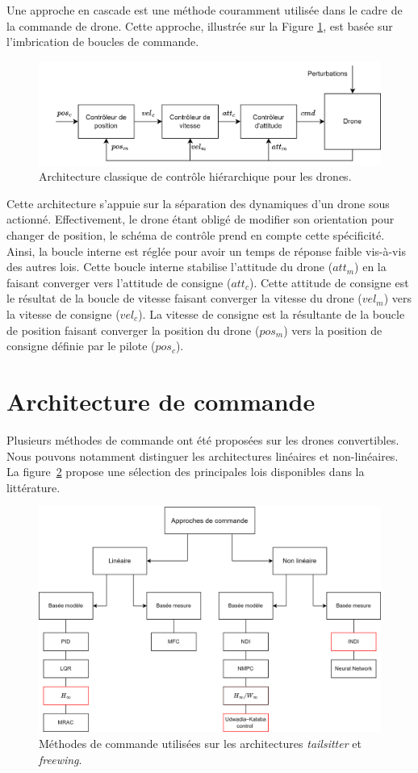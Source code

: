 Une approche en cascade est une méthode couramment utilisée dans le cadre de la commande de drone. Cette approche, illustrée sur la Figure \ref{fig:schemahiera}, est basée sur l'imbrication de boucles de  commande.
\begin{figure}[ht!]
    \centerline{
    \includegraphics[trim=0cm 0cm 0cm 0cm,clip,width=0.8\columnwidth]{figures/controlhierachique.png}}
    \caption{Architecture classique de contrôle hiérarchique pour les drones.}
    \label{fig:schemahiera}
\end{figure}
Cette architecture s'appuie sur la séparation des dynamiques d'un drone sous actionné. Effectivement, le drone étant obligé de modifier son orientation pour changer de position, le schéma de contrôle prend en compte cette spécificité. Ainsi, la boucle interne est réglée pour avoir un temps de réponse faible vis-à-vis des autres lois. Cette boucle interne stabilise l'attitude du drone ($att_{m}$) en la faisant converger vers l'attitude de consigne ($att_{c}$). Cette attitude de consigne est le résultat de la boucle de vitesse faisant converger la vitesse du drone ($vel_{m}$) vers la vitesse de consigne ($vel_{c}$). La vitesse de consigne est la résultante de la boucle de position faisant converger la position du drone ($pos_{m}$) vers la position de consigne définie par le pilote ($pos_{c}$).


\section{Architecture de commande}
\label{sec:archcmd}
Plusieurs méthodes de commande ont été proposées sur les drones convertibles. Nous pouvons notamment distinguer les architectures linéaires et non-linéaires. La figure~\ref{fig:methodecmd} propose une sélection des principales lois disponibles dans la littérature.

\begin{figure}[H]
    \centerline{
    \includegraphics[trim=0cm 0cm 0cm 0cm,clip,width=0.8\columnwidth]{figures/controle_methode.png}}
    \caption{Méthodes de commande utilisées sur les architectures \textit{tailsitter} et \textit{freewing}.}
    \label{fig:methodecmd}
\end{figure}


